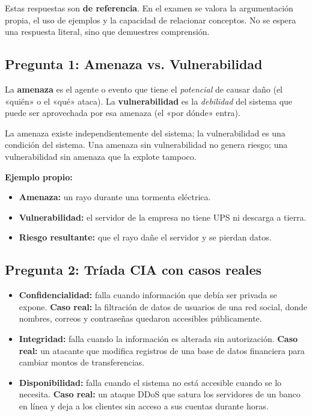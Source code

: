\documentclass[11pt,a4paper]{article}
\begin{document}
\begin{clave}
Estas respuestas son \textbf{de referencia}. En el examen se valora la argumentación propia, el uso de ejemplos y la capacidad de relacionar conceptos. No se espera una respuesta literal, sino que demuestres comprensión.
\end{clave}

\subsection*{Pregunta 1: Amenaza vs. Vulnerabilidad}
\begin{respuesta}
La \textbf{amenaza} es el agente o evento que tiene el \textit{potencial} de causar daño (el «quién» o el «qué» ataca). La \textbf{vulnerabilidad} es la \textit{debilidad} del sistema que puede ser aprovechada por esa amenaza (el «por dónde» entra).

La amenaza existe independientemente del sistema; la vulnerabilidad es una condición del sistema. Una amenaza sin vulnerabilidad no genera riesgo; una vulnerabilidad sin amenaza que la explote tampoco.

\textbf{Ejemplo propio:}
\begin{itemize}[leftmargin=*]
  \item \textbf{Amenaza:} un rayo durante una tormenta eléctrica.
  \item \textbf{Vulnerabilidad:} el servidor de la empresa no tiene UPS ni descarga a tierra.
  \item \textbf{Riesgo resultante:} que el rayo dañe el servidor y se pierdan datos.
\end{itemize}
\end{respuesta}

\subsection*{Pregunta 2: Tríada CIA con casos reales}
\begin{respuesta}
\begin{itemize}[leftmargin=*]
  \item \textbf{Confidencialidad:} falla cuando información que debía ser privada se expone. \textbf{Caso real:} la filtración de datos de usuarios de una red social, donde nombres, correos y contraseñas quedaron accesibles públicamente.
  \item \textbf{Integridad:} falla cuando la información es alterada sin autorización. \textbf{Caso real:} un atacante que modifica registros de una base de datos financiera para cambiar montos de transferencias.
  \item \textbf{Disponibilidad:} falla cuando el sistema no está accesible cuando se lo necesita. \textbf{Caso real:} un ataque DDoS que satura los servidores de un banco en línea y deja a los clientes sin acceso a sus cuentas durante horas.
\end{itemize}
\end{respuesta}
\end{document}
